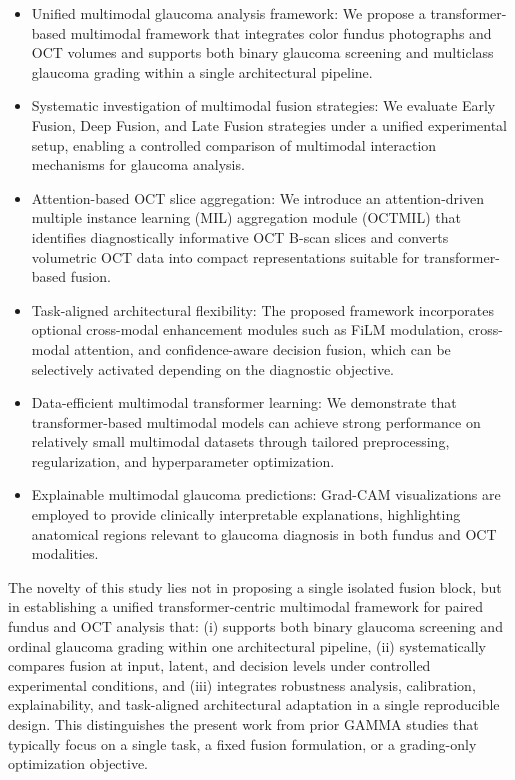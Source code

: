 \documentclass[preprint,12pt]{elsarticle}
\begin{document}
\begin{itemize}

     \item {Unified multimodal glaucoma analysis framework:}
           We propose a transformer-based multimodal framework that integrates color fundus photographs and OCT volumes and supports both binary glaucoma screening and multiclass glaucoma grading within a single architectural pipeline.

     \item {Systematic investigation of multimodal fusion strategies:}
           We evaluate Early Fusion, Deep Fusion, and Late Fusion strategies under a unified experimental setup, enabling a controlled comparison of multimodal interaction mechanisms for glaucoma analysis.

     \item {Attention-based OCT slice aggregation:}
           We introduce an attention-driven multiple instance learning (MIL) aggregation module (OCTMIL) that identifies diagnostically informative OCT B-scan slices and converts volumetric OCT data into compact representations suitable for transformer-based fusion.

     \item {Task-aligned architectural flexibility:}
           The proposed framework incorporates optional cross-modal enhancement modules such as FiLM modulation, cross-modal attention, and confidence-aware decision fusion, which can be selectively activated depending on the diagnostic objective.

     \item {Data-efficient multimodal transformer learning:}
           We demonstrate that transformer-based multimodal models can achieve strong performance on relatively small multimodal datasets through tailored preprocessing, regularization, and hyperparameter optimization.

     \item {Explainable multimodal glaucoma predictions:}
           Grad-CAM visualizations are employed to provide clinically interpretable explanations, highlighting anatomical regions relevant to glaucoma diagnosis in both fundus and OCT modalities.

\end{itemize}

The novelty of this study lies not in proposing a single isolated fusion block, but in establishing a unified transformer-centric multimodal framework for paired fundus and OCT analysis that: (i) supports both binary glaucoma screening and ordinal glaucoma grading within one architectural pipeline, (ii) systematically compares fusion at input, latent, and decision levels under controlled experimental conditions, and (iii) integrates robustness analysis, calibration, explainability, and task-aligned architectural adaptation in a single reproducible design. This distinguishes the present work from prior GAMMA studies that typically focus on a single task, a fixed fusion formulation, or a grading-only optimization objective.
\end{document}
